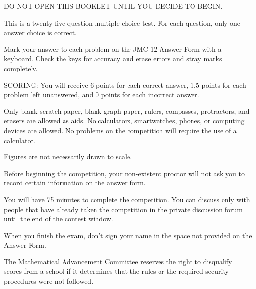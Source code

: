 \documentclass[10pt, twoside]{article}
\newcommand{\contestName}{JMC}
\newcommand{\contestNumber}{12}
\newcommand{\committeeName}{Mathematical Advancement Committee}
\begin{document}
\begin{justify}
\begin{enumerate}[noitemsep, nolistsep, leftmargin=*]

\small{
\item DO NOT OPEN THIS BOOKLET UNTIL YOU DECIDE TO BEGIN.
\item This is a twenty-five question multiple choice test. For each question, only one answer choice is correct.
\item Mark your answer to each problem on the {\contestName} {\contestNumber} Answer Form with a keyboard. Check the keys for accuracy and erase errors and stray marks completely.
\item SCORING: You will receive 6 points for each correct answer, 1.5 points for each problem left unanswered, and 0 points for each incorrect answer.
\item Only blank scratch paper, blank graph paper, rulers, compasses, protractors, and erasers are allowed as aids. No calculators, smartwatches, phones, or computing devices are allowed. No problems on the competition will require the use of a calculator.
\item Figures are not necessarily drawn to scale.
\item Before beginning the competition, your non-existent proctor will not ask you to record certain information on the answer form. 
\item You will have 75 minutes to complete the competition. You can discuss only with people that have already taken the competition in the private discussion forum until the end of the contest window.
\item When you finish the exam, don't sign your name in the space not provided on the Answer Form.
}

\end{enumerate}

\vspace{-4mm}

\begin{center} \noindent\hrulefill \end{center}

\vspace{-5mm}

\small{
\begin{justify}
The {\committeeName} reserves the right to disqualify scores from a school if it determines that the rules or the required security procedures were not followed.
\end{justify}

}
\end{justify}
\end{document}
